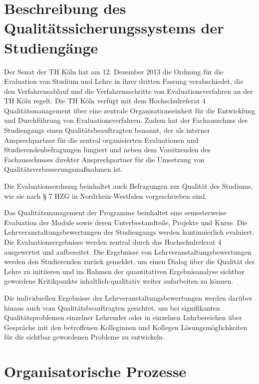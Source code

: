 \section{Beschreibung des Qualitätssicherungssystems der
Studiengänge\label{/mi-2017/selbstbericht/0900-transparenz-und-dokumentation/0000-transparenz-und-dokumentation}}\label{beschreibung-des-qualituxe4tssicherungssystems-der-studienguxe4ngepathlabelmi-2017selbstbericht0900-transparenz-und-dokumentation0000-transparenz-und-dokumentation}

Der Senat der TH Köln hat am 12. Dezember 2013 die Ordnung für die
Evaluation von Studium und Lehre in ihrer dritten Fassung verabschiedet,
die den Verfahrensablauf und die Verfahrensschritte von
Evaluationsverfahren an der TH Köln regelt. Die TH Köln verfügt mit dem
Hochschulreferat 4 Qualitätsmanagement über eine zentrale
Organisationseinheit für die Entwicklung und Durchführung von
Evaluationsverfahren. Zudem hat der Fachausschuss des Studiengangs einen
Qualitätsbeauftragten benannt, der als interner Ansprechpartner für die
zentral organisierten Evaluationen und Studierendenbefragungen fungiert
und neben dem Vorsitzenden des Fachausschusses direkter Ansprechpartner
für die Umsetzung von Qualitätsverbesserungsmaßnahmen ist.

Die Evaluationsordnung beinhaltet auch Befragungen zur Qualität des
Studiums, wie sie nach § 7 HZG in Nordrhein-Westfalen vorgeschrieben
sind.

Das Qualitätsmanagement der Programme beinhaltet eine semesterweise
Evaluation der Module sowie deren Unterbestandteile, Projekte und Kurse.
Die Lehrveranstaltungsbewertungen des Studiengangs werden kontinuierlich
evaluiert. Die Evaluationsergebnisse werden zentral durch das
Hochschulreferat 4 ausgewertet und aufbereitet. Die Ergebnisse von
Lehrveranstaltungsbewertungen werden den Studierenden zurück gemeldet,
um einen Dialog über die Qualität der Lehre zu initiieren und im Rahmen
der quantitativen Ergebnisanalyse sichtbar gewordene Kritikpunkte
inhaltlich-qualitativ weiter aufarbeiten zu können.

Die individuellen Ergebnisse der Lehrveranstaltungsbewertungen werden
darüber hinaus auch vom Qualitätsbeauftragten gesichtet, um bei
signifikanten Qualitätsproblemen einzelner Lehrender oder in einzelnen
Lehrbereichen über Gespräche mit den betroffenen Kolleginnen und
Kollegen Lösungsmöglichkeiten für die sichtbar gewordenen Probleme zu
entwickeln.

\section{Organisatorische
Prozesse\label{/mi-2017/selbstbericht/0900-transparenz-und-dokumentation/0000-transparenz-und-dokumentation}}\label{organisatorische-prozessepathlabelmi-2017selbstbericht0900-transparenz-und-dokumentation0000-transparenz-und-dokumentation}

